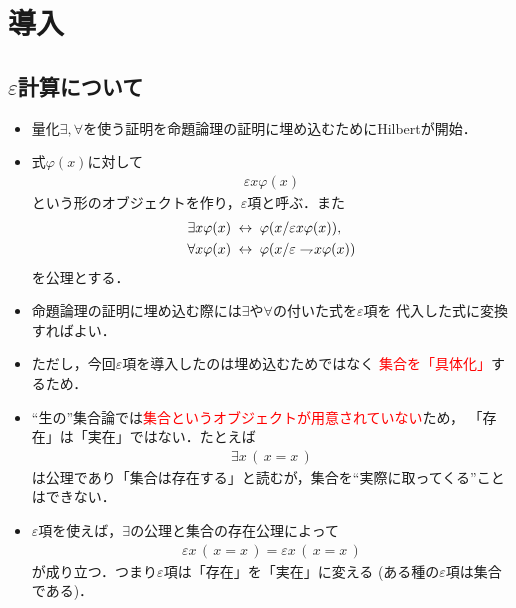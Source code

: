 \section{導入}
\subsection{$\varepsilon$計算について}
	\begin{itemize}
		\item 量化$\exists,\forall$を使う証明を命題論理の証明に埋め込むためにHilbertが開始．
		
		\vspace{5pt}
		
		\item 式$\varphi(x)$に対して
			\begin{align}
				\varepsilon x \varphi(x)
			\end{align}
			という形のオブジェクトを作り，$\varepsilon$項と呼ぶ．また
			\begin{align}
				\exists x \varphi(x) &\hspace{0.25em}\leftrightarrow\hspace{0.25em} \varphi(x/\varepsilon x \varphi(x)), \\
				\forall x \varphi(x) &\hspace{0.25em}\leftrightarrow\hspace{0.25em} \varphi(x/\varepsilon \rightharpoondown\hspace{-0.25em} x \varphi(x))
			\end{align}
			を公理とする．
			
		\item 命題論理の証明に埋め込む際には$\exists$や$\forall$の付いた式を$\varepsilon$項を
			代入した式に変換すればよい．
			
		\item ただし，今回$\varepsilon$項を導入したのは埋め込むためではなく
			\textcolor{red}{集合を「具体化」}するため．
	
\newpage
		\item ``生の''集合論では\textcolor{red}{集合というオブジェクトが用意されていない}ため，
			「存在」は「実在」ではない．たとえば
			\begin{align}
				\exists x\, (\, x = x\, )
			\end{align}
			は公理であり「集合は存在する」と読むが，集合を``実際に取ってくる''ことはできない．
			
		\item $\varepsilon$項を使えば，$\exists$の公理と集合の存在公理によって
			\begin{align}
				\varepsilon x\, (\, x = x\, ) = \varepsilon x\, (\, x = x\, )
			\end{align}
			が成り立つ．つまり$\varepsilon$項は「存在」を「実在」に変える
			(ある種の$\varepsilon$項は集合である)．
	\end{itemize}
	
